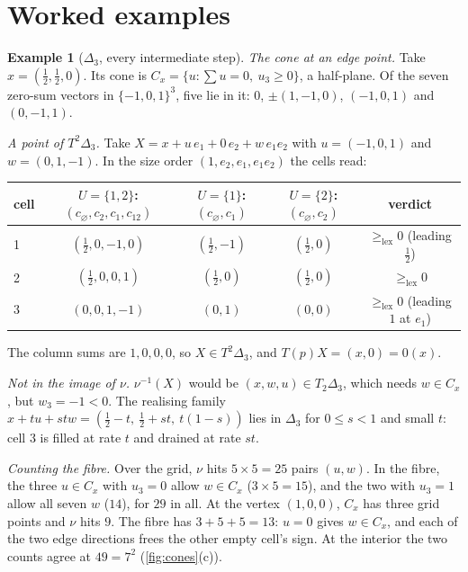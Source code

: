 \documentclass[11pt]{article}
\theoremstyle{definition}\newtheorem{definition}[theorem]{Definition}\newtheorem{remark}[theorem]{Remark}\newtheorem{example}[theorem]{Example}
\newcommand{\lex}{\ge_{\mathrm{lex}}}
\begin{document}
\section{Worked examples}\label{sec:worked}
\begin{example}[$\Delta_3$, every intermediate step]\label{ex:delta3}
\emph{The cone at an edge point.} Take $x=(\tfrac12,\tfrac12,0)$. Its cone is $C_x=\{u:\sum u=0,\ u_3\ge0\}$, a half-plane. Of the seven
zero-sum vectors in $\{-1,0,1\}^3$, five lie in it: $0$, $\pm(1,-1,0)$, $(-1,0,1)$ and $(0,-1,1)$.

\emph{A point of $T^2\Delta_3$.} Take $X=x+u\,e_1+0\,e_2+w\,e_1e_2$ with $u=(-1,0,1)$ and $w=(0,1,-1)$. In the size order
$(1,e_2,e_1,e_1e_2)$ the cells read:
\begin{center}\small
\begin{tabular}{lcccc}\toprule
cell & $U=\{1,2\}$: $(c_\varnothing,c_2,c_1,c_{12})$ & $U=\{1\}$: $(c_\varnothing,c_1)$ & $U=\{2\}$: $(c_\varnothing,c_2)$ & verdict\\\midrule
1 & $(\tfrac12,0,-1,0)$ & $(\tfrac12,-1)$ & $(\tfrac12,0)$ & $\lex0$ (leading $\tfrac12$)\\
2 & $(\tfrac12,0,0,1)$ & $(\tfrac12,0)$ & $(\tfrac12,0)$ & $\lex0$\\
3 & $(0,0,1,-1)$ & $(0,1)$ & $(0,0)$ & $\lex0$ (leading $1$ at $e_1$)\\\bottomrule
\end{tabular}
\end{center}
The column sums are $1,0,0,0$, so $X\in T^2\Delta_3$, and $T(p)X=(x,0)=0(x)$.

\emph{Not in the image of $\nu$.} $\nu^{-1}(X)$ would be $(x,w,u)\in T_2\Delta_3$, which needs $w\in C_x$, but $w_3=-1<0$. The realising
family $x+tu+stw=(\tfrac12-t,\ \tfrac12+st,\ t(1-s))$ lies in $\Delta_3$ for $0\le s<1$ and small $t$: cell $3$ is filled at rate $t$ and
drained at rate $st$.

\emph{Counting the fibre.} Over the grid, $\nu$ hits $5\times5=25$ pairs $(u,w)$. In the fibre, the three $u\in C_x$ with $u_3=0$ allow
$w\in C_x$ ($3\times5=15$), and the two with $u_3=1$ allow all seven $w$ ($14$), for $29$ in all. At the vertex $(1,0,0)$, $C_x$ has
three grid points and $\nu$ hits $9$. The fibre has $3+5+5=13$: $u=0$ gives $w\in C_x$, and each of the two edge directions frees the
other empty cell's sign. At the interior the two counts agree at $49=7^2$ (\cref{fig:cones}(c)).
\end{example}
\end{document}
